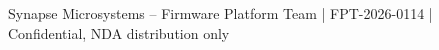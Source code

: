 \documentclass[11pt,a4paper,parskip=half]{scrartcl}
\begin{document}
\vspace{0.6cm}
\begin{center}
\small\color{gray}
Synapse Microsystems -- Firmware Platform Team \hspace{4pt}|\hspace{4pt} FPT-2026-0114 \hspace{4pt}|\hspace{4pt} Confidential, NDA distribution only
\end{center}
\end{document}
